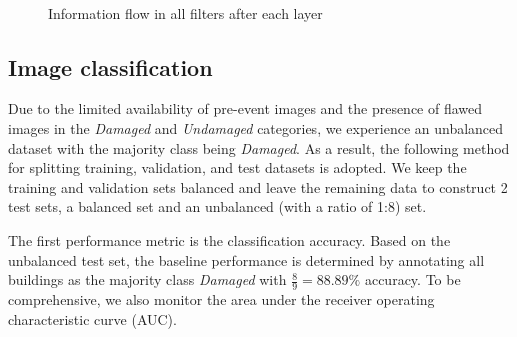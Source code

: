 \documentclass[journal, 12pt, onecolumn,draftclsnofoot]{IEEEtran}
\begin{document}
\begin{figure}[h]{\centering
{}
\\
\caption{\small{Information flow in all filters after each layer}}
\label{fig:flow}
}
\end{figure}




\subsection{Image classification}\label{sec:classification}
Due to the limited availability of pre-event images and the presence of flawed images in the \textit{Damaged} and \textit{Undamaged} categories, we experience an unbalanced dataset with the majority class being \textit{Damaged}. As a result, the following method for splitting training, validation, and test datasets is adopted. We keep the training and validation sets balanced and leave the remaining data to construct 2 test sets, a balanced set and an unbalanced (with a ratio of 1:8) set. 

The first performance metric is the classification accuracy. Based on the unbalanced test set, the baseline performance is determined by annotating all buildings as the majority class \textit{Damaged} with $\frac{8}{9}=88.89\%$ accuracy. To be comprehensive, we also monitor the area under the receiver operating characteristic curve (AUC).



\end{document}
